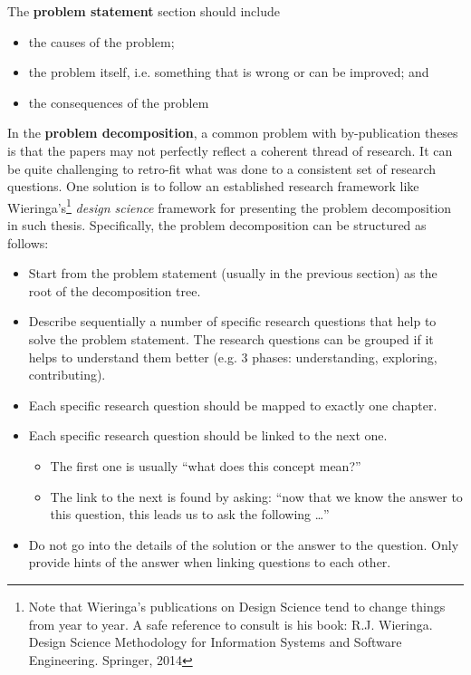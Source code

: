 The \textbf{problem statement} section should include
\begin{itemize}
    \item the causes of the problem;
    \item the problem itself, i.e. something that is wrong
    or can be improved; and
    \item the consequences of the problem
\end{itemize}

In the \textbf{problem decomposition}, a common problem
with by-publication theses is that the papers may not perfectly reflect
a coherent thread of research. It can be quite challenging to retro-fit
what was done to a consistent set of research questions. One solution
is to follow an established research framework like Wieringa's\footnote{
    Note that Wieringa's publications on Design Science tend to change things
    from year to year. A safe reference to consult is his book: R.J. Wieringa.
    Design Science Methodology for Information Systems
    and Software Engineering. Springer, 2014}
\emph{design science} framework for presenting the problem decomposition
in such thesis. Specifically, the problem decomposition
can be structured as follows:

\begin{itemize}
    \item Start from the problem statement (usually in the previous section)
    as the root of the decomposition tree.
    \item Describe sequentially a number of specific research questions
    that help to solve the problem statement. The research questions
    can be grouped if it helps to understand them better (e.g. 3 phases:
    understanding, exploring, contributing).
    \item Each specific research question should be mapped
    to exactly one chapter.
    \item Each specific research question should be linked to the next one.
    \begin{itemize}
        \item The first one is usually ``what does this concept mean?''
        \item The link to the next is found by asking: ``now that we know
        the answer to this question, this leads us to ask the following \dots''
    \end{itemize}
    \item Do not go into the details of the solution or the answer
    to the question. Only provide hints of the answer when linking questions
    to each other.
\end{itemize}

